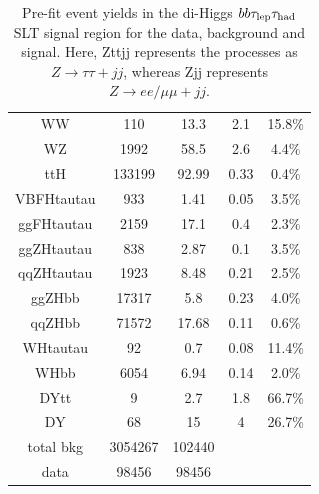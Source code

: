 \begin{table}
\begin{tabular}{|c|c|c|c|c|}
WW    &         110         &13.3        &2.1           &       15.8\%      \\
WZ    &         1992          &58.5        &2.6           &       4.4\%      \\
ttH     &         133199          &92.99        &0.33           &       0.4\%      \\
VBFHtautau    &         933         &1.41        &0.05           &       3.5\%      \\
ggFHtautau    &         2159          &17.1        &0.4           &       2.3\%      \\
ggZHtautau    &         838         &2.87        &0.1           &       3.5\%      \\
qqZHtautau    &         1923          &8.48        &0.21           &       2.5\%      \\
ggZHbb    &         17317         &5.8        &0.23           &       4.0\%      \\
qqZHbb    &         71572         &17.68        &0.11           &       0.6\%      \\
WHtautau    &         92          &0.7        &0.08           &       11.4\%      \\
WHbb    &         6054          &6.94        &0.14           &       2.0\%      \\
DYtt    &         9         &2.7        &1.8           &       66.7\%      \\
DY    &         68          &15        &4           &       26.7\%      \\
\hline
\hline
total bkg  & 3054267 & 102440 & &\\
data         & 98456     & 98456	& &\\
 \hline
 \hline
    \end{tabular}
    \caption{Pre-fit event yields in the di-Higgs $bb\tau_{\mathrm{lep}}\tau_{\mathrm{had}}$ SLT signal region for the data, 
    background and signal. Here, Zttjj represents the processes as $Z\rightarrow\tau\tau + jj$,
    whereas Zjj represents  $Z\rightarrow ee/\mu\mu + jj$.}
    \label{tab:LepHadSLTYields}
\end{table}
